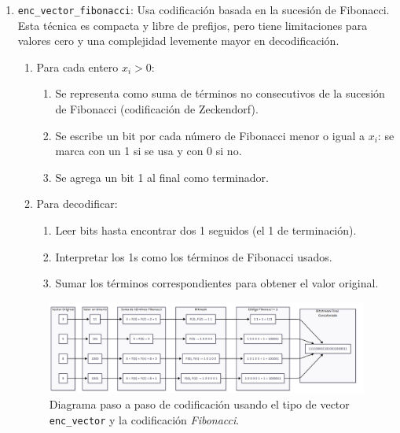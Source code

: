 \begin{enumerate}
    \item \texttt{enc\_vector\_fibonacci}:
        Usa codificación basada en la sucesión de Fibonacci. Esta técnica es compacta y libre de prefijos, pero tiene limitaciones para valores cero y una complejidad levemente mayor en decodificación.
        
        \begin{enumerate}
            \item Para cada entero \(x_i > 0\):
            \begin{enumerate}
                \item Se representa como suma de términos no consecutivos de la sucesión de Fibonacci (codificación de Zeckendorf).
                \item Se escribe un bit por cada número de Fibonacci menor o igual a \(x_i\): se marca con un 1 si se usa y con 0 si no.
                \item Se agrega un bit 1 al final como terminador.
            \end{enumerate}
        
            \item Para decodificar:
            \begin{enumerate}
                \item Leer bits hasta encontrar dos 1 seguidos (el 1 de terminación).
                \item Interpretar los 1s como los términos de Fibonacci usados.
                \item Sumar los términos correspondientes para obtener el valor original.
            \end{enumerate}
        \end{enumerate}
        
        \begin{figure}
            \centering
            \includegraphics[width=0.9\linewidth]{alternatives/images/enc_vector_fibonacci.png}
            \caption[Ejemplo \texttt{enc\_vector\_fibonacci}]{Diagrama paso a paso de codificación usando el tipo de vector \texttt{enc\_vector} y la codificación \textit{Fibonacci}.}
            \label{enc_vector_fibonacci}
        \end{figure}
        


\end{enumerate}
